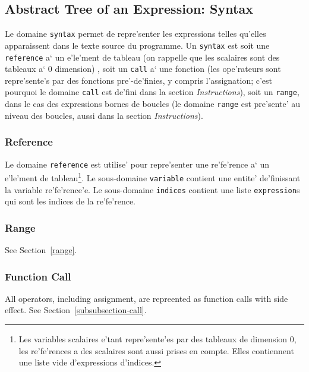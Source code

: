 \subsection{Abstract Tree of an Expression: Syntax}
\label{subsection-syntax}

{
Le domaine \verb/syntax/ permet de repre'senter les expressions telles
qu'elles apparaissent dans le texte source du programme. Un
\verb/syntax/ est soit une \verb/reference/ a` un e'le'ment de tableau
(on rappelle que les scalaires sont des tableaux a` 0 dimension) , soit
un \verb/call/ a` une fonction (les ope'rateurs sont repre'sente's par
des fonctions pre'-de'finies, y compris l'assignation; c'est pourquoi le
domaine {\tt call} est de'fini dans la section {\em Instructions}), soit
un \verb/range/, dans le cas des expressions bornes de boucles (le domaine
{\tt range} est pre'sente' au niveau des boucles, aussi dans la section
{\em Instructions}).
}

\subsubsection{Reference}
\label{subsubsection-reference}

{
Le domaine \verb/reference/ est utilise' pour repre'senter une
re'fe'rence a` un e'le'ment de tableau\footnote{Les variables scalaires
e'tant repre'sente'es par des tableaux de dimension 0, les re'fe'rences
a des scalaires sont aussi prises en compte. Elles contiennent une liste
vide d'expressions d'indices.}.  Le sous-domaine \verb/variable/
contient une entite' de'finissant la variable re'fe'rence'e. Le
sous-domaine \verb/indices/ contient une liste {\tt expression}s qui sont les
indices de la re'fe'rence.
}

\subsubsection{Range}

See Section~\ref{range}.

\subsubsection{Function Call}

All operators, including assignment, are repreented as function calls
with side effect. See Section~\ref{subsubsection-call}.

